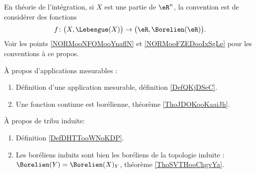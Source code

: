 En théorie de l'intégration, si \( X\) est une partie de \( \eR^n\), la convention est de considérer des fonctions
\begin{equation*}
    f\colon \big( X,\Lebesgue(X) \big)\to \big( \eR,\Borelien(\eR) \big).
\end{equation*}
Voir les points \ref{NORMooNFOMooYnaflN} et \ref{NORMooFZEDooIxSgLe} pour les conventions à ce propos.

À propos d'applications mesurables :
\begin{enumerate}
    \item
        Définition d'une application mesurable, définition \ref{DefQKjDSeC}.
    \item
        Une fonction continue est borélienne, théorème \ref{ThoJDOKooKaaiJh}.
\end{enumerate}


À propos de tribu induite:
\begin{enumerate}
    \item
        Définition \ref{DefDHTTooWNoKDP}.
    \item
        Les boréliens induits sont bien les boréliens de la topologie induite : \( \Borelien(Y)=\Borelien(X)_Y\), théorème \ref{ThoSVTHooChgvYa}.
\end{enumerate}


